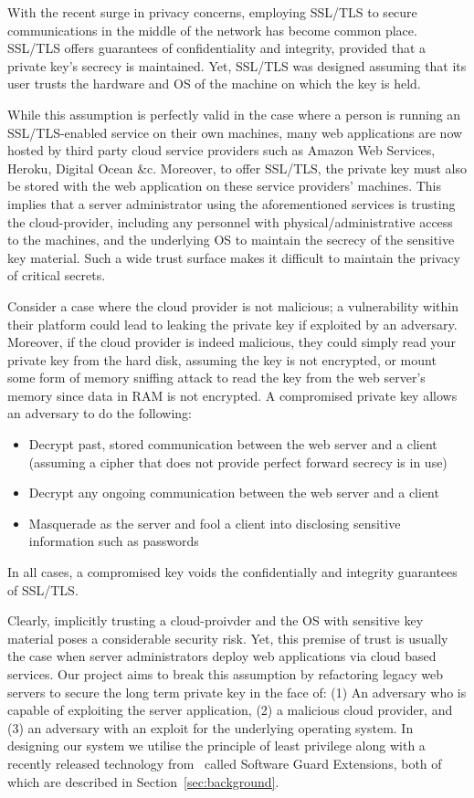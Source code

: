 \documentclass[../main.tex]{subfiles}
\begin{document}
With the recent surge in privacy concerns, employing SSL/TLS to secure
communications in the middle of the network has become common
place. SSL/TLS offers guarantees of confidentiality and integrity,
provided that a private key's secrecy is maintained. Yet, SSL/TLS was
designed assuming that its user trusts the hardware and OS of the
machine on which the key is held.
 
While this assumption is perfectly valid in the case where a person is
running an SSL/TLS-enabled service on their own machines, many web
applications are now hosted by third party cloud service providers
such as Amazon Web Services, Heroku, Digital Ocean \&c. Moreover, to
offer SSL/TLS, the private key must also be stored with the web
application on these service providers' machines. This implies that a
server administrator using the aforementioned services is trusting the
cloud-provider, including any personnel with physical/administrative
access to the machines, and the underlying OS to maintain the secrecy
of the sensitive key material. Such a wide trust surface makes it
difficult to maintain the privacy of critical secrets.


Consider a case where the cloud provider is not malicious; a
vulnerability within their platform could lead to leaking the private
key if exploited by an adversary. Moreover, if the cloud provider is
indeed malicious, they could simply read your private key from the hard
disk, assuming the key is not encrypted, or mount some form of memory
sniffing attack to read the key from the web server's memory since
data in RAM is not encrypted. A compromised private key allows an
adversary to do the following:
\begin{itemize}
  \item Decrypt past, stored communication between the web server and a
    client (assuming a cipher that does not provide perfect forward
    secrecy is in use)
  \item Decrypt any ongoing communication between the web server and a
    client
  \item Masquerade as the server and fool a client into disclosing
    sensitive information such as passwords
\end{itemize}
In all cases, a compromised key voids the confidentially and integrity
guarantees of SSL/TLS.

Clearly, implicitly trusting a cloud-proivder and the OS with
sensitive key material poses a considerable security risk. Yet, this
premise of trust is usually the case when server administrators
deploy web applications via cloud based services. Our project aims to
break this assumption by refactoring legacy web servers to secure the
long term private key in the face of: (1) An adversary who is capable
of exploiting the server application, (2) a malicious cloud provider,
and (3) an adversary with an exploit for the underlying operating
system. In designing our system we utilise the principle of least
privilege along with a recently released technology from
\Intel~called Software Guard Extensions, both of which are described
in Section~\ref{sec:background}.
\end{document}
